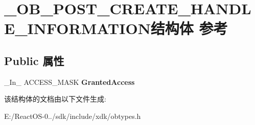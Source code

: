 \hypertarget{struct___o_b___p_o_s_t___c_r_e_a_t_e___h_a_n_d_l_e___i_n_f_o_r_m_a_t_i_o_n}{}\section{\+\_\+\+O\+B\+\_\+\+P\+O\+S\+T\+\_\+\+C\+R\+E\+A\+T\+E\+\_\+\+H\+A\+N\+D\+L\+E\+\_\+\+I\+N\+F\+O\+R\+M\+A\+T\+I\+O\+N结构体 参考}
\label{struct___o_b___p_o_s_t___c_r_e_a_t_e___h_a_n_d_l_e___i_n_f_o_r_m_a_t_i_o_n}
\subsection*{Public 属性}
\begin{DoxyCompactItemize}
\item 
\mbox{\label{struct___o_b___p_o_s_t___c_r_e_a_t_e___h_a_n_d_l_e___i_n_f_o_r_m_a_t_i_o_n_afabbccac4c1cd2d8738927f7fede2f9d}} 
\+\_\+\+In\+\_\+ A\+C\+C\+E\+S\+S\+\_\+\+M\+A\+SK {\bfseries Granted\+Access}
\end{DoxyCompactItemize}


该结构体的文档由以下文件生成\+:\begin{DoxyCompactItemize}
\item 
E\+:/\+React\+O\+S-\/0../sdk/include/xdk/obtypes.\+h\end{DoxyCompactItemize}
